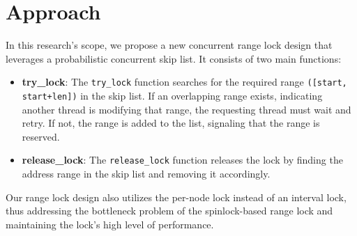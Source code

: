 
\chapter{Approach}\label{chapter:approach}

In this research's scope, we propose a new concurrent range lock design that leverages a probabilistic concurrent skip list\parencite{herlihy2006provably, herlihy2020art}. It consists of two main functions:
\begin{itemize}
    \item \textbf{try\_lock}: The \texttt{try\_lock} function searches for the required range \texttt{([start, start+len])} in the skip list. If an overlapping range exists, indicating another thread is modifying that range, the requesting thread must wait and retry. If not, the range is added to the list, signaling that the range is reserved.
    \item \textbf{release\_lock}: The \texttt{release\_lock} function releases the lock by finding the address range in the skip list and removing it accordingly.
\end{itemize} 

Our range lock design also utilizes the per-node lock instead of an interval lock, thus addressing the bottleneck problem of the spinlock-based range lock and maintaining the lock's high level of performance. 